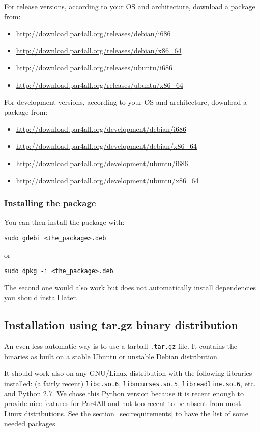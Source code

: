 \documentclass[a4paper]{article}
\begin{document}
For release versions, according to your OS and architecture, download a package from:
\begin{itemize}
\item \url{http://download.par4all.org/releases/debian/i686}
\item \url{http://download.par4all.org/releases/debian/x86_64}
\item \url{http://download.par4all.org/releases/ubuntu/i686}
\item \url{http://download.par4all.org/releases/ubuntu/x86_64}
\end{itemize}


For development versions, according to your OS and architecture, download a package from:
\begin{itemize}
\item \url{http://download.par4all.org/development/debian/i686}
\item \url{http://download.par4all.org/development/debian/x86_64}
\item \url{http://download.par4all.org/development/ubuntu/i686}
\item \url{http://download.par4all.org/development/ubuntu/x86_64}
\end{itemize}

\subsubsection{Installing the package}
You can then install the package with:
\begin{verbatim}
sudo gdebi <the_package>.deb
\end{verbatim}
or
\begin{verbatim}
sudo dpkg -i <the_package>.deb
\end{verbatim}

The second one would also work but does not
automatically install dependencies you should install later.


\subsection{Installation using tar.gz binary distribution}

An even less automatic way is to use a tarball \texttt{.tar.gz} file. It
contains the binaries as built on a stable Ubuntu or unstable Debian
distribution.

It should work also on any GNU/Linux distribution with the following
libraries installed: (a fairly recent) \texttt{libc.so.6},
\texttt{libncurses.so.5}, \texttt{libreadline.so.6}, etc. and Python
2.7. We chose this Python version because it is recent enough to provide
nice features for Par4All and not too recent to be absent from most Linux
distributions. See the section~\ref{sec:requirements} to have the list of
some needed packages.
\end{document}
